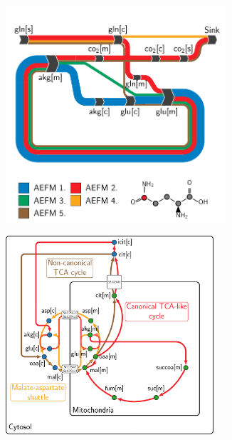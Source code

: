 \documentclass[varwidth]{standalone}
\begin{document}
\begin{figure}
\begin{subfigure}[t]{0.495\textwidth}
    \end{subfigure}
    \begin{subfigure}[t]{0.495\textwidth}
        \caption{}
        \centering
        \includegraphics[width=0.9\textwidth,trim={0.0cm 0.0cm 0.0cm 1.0cm},clip]{subpanels-c-f/glutamine/carbon-5/04-add-labels/add-labels.pdf}
    \end{subfigure}
    \begin{subfigure}[t]{0.495\textwidth}
        \caption{}
        \centering
        \includegraphics[width=0.85\textwidth,trim={0.0cm 0.0cm 0.0cm 0.0cm},clip]{subpanels-c-f/glutamine/network-mapping/network-v2.pdf}
    \end{subfigure}
\end{figure}
\end{document}
